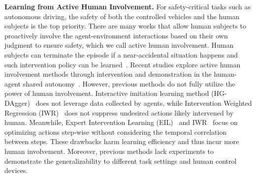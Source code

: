 \textbf{Learning from Active Human Involvement.}
For safety-critical tasks such as autonomous driving, the safety of both the controlled vehicles and the human subjects is the top priority. 
There are many works that allow human subjects to proactively involve the agent-environment interactions based on their own judgment to ensure safety, which we call active human involvement.
Human subjects can terminate the episode if a near-accidental situation happens and such intervention policy can be learned~\citep{zhang2017query,abel2017agent,saunders2018trial,pakdamanian2021deeptake,xu2022look,wang2021appli}. 
Recent studies explore active human involvement methods through intervention and demonstration in the human-agent shared autonomy~\citep{macglashan2017interactive,menda2019ensembledagger,kelly2019hg,spencer2020learning,li2021efficient,jonnavittula2021learning,xu2022look}.
However, previous methods do not fully utilize the power of human involvement.
Interactive imitation learning method (HG-DAgger)~\citep{kelly2019hg} does not leverage data collected by agents, while Intervention Weighted Regression (IWR)~\citep{mandlekar2020human} does not suppress undesired actions likely intervened by human.
Meanwhile, Expert Intervention Learning (EIL)~\citep{spencer2020learning} and IWR~\citep{mandlekar2020human} focus on optimizing actions step-wise without considering the temporal correlation between steps.
These drawbacks harm learning efficiency and thus incur more human involvement.
Moreover, previous methods lack experiments to demonstrate the generalizability to different task settings and human control devices.



